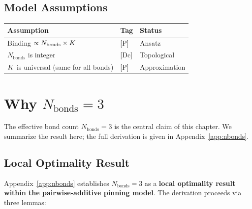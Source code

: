 \subsection{Model Assumptions}

\begin{center}
\begin{tabular}{lll}
\toprule
\textbf{Assumption} & \textbf{Tag} & \textbf{Status} \\
\midrule
Binding $\propto N_{\text{bonds}} \times K$ & [P] & Ansatz \\
$N_{\text{bonds}}$ is integer & [Dc] & Topological \\
$K$ is universal (same for all bonds) & [P] & Approximation \\
\bottomrule
\end{tabular}
\end{center}

\section{Why $N_{\text{bonds}} = 3$}
\label{sec:d:three}

The effective bond count $N_{\text{bonds}} = 3$ is the central claim of
this chapter. We summarize the result here; the full derivation is given
in Appendix~\ref{app:nbonds}.

\subsection{Local Optimality Result}

Appendix~\ref{app:nbonds} establishes $N_{\text{bonds}} = 3$ as a
\textbf{local optimality result within the pairwise-additive pinning model}.
The derivation proceeds via three lemmas:

